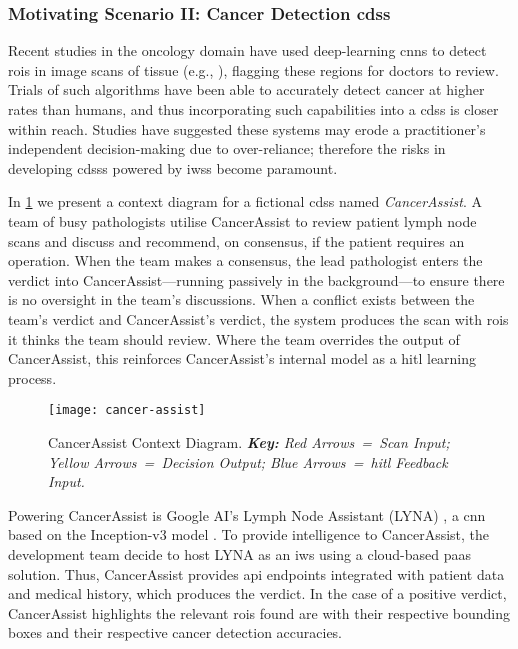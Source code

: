 
\subsubsection{Motivating Scenario II: Cancer Detection \gls{cdss}}
\label{ssec:introduction:motivation:scenario:cancer}

Recent studies in the oncology domain have used deep-learning \glspl{cnn} to detect \glspl{roi} in image scans of tissue (e.g., \citep{Liu:2018fa,Haenssle:2018bz,EhteshamiBejnordi:2017kq}), flagging these regions for doctors to review. Trials of such algorithms have been able to accurately detect cancer at higher rates than humans, and thus incorporating such capabilities into a \gls{cdss} is closer within reach.  Studies have suggested these systems may erode a practitioner's independent decision-making \citep{Jaspers:2011hy,Chambers:1991uh} due to over-reliance; therefore the risks in developing \glspl{cdss} powered by \glspl{iws} become paramount.

In \cref{fig:introduction:motivation:scenario:cancer} we present a context diagram for a fictional \gls{cdss} named \textit{CancerAssist}. A team of busy pathologists utilise CancerAssist to review patient lymph node scans and discuss and recommend, on consensus, if the patient requires an operation. When the team makes a consensus, the lead pathologist enters the verdict into CancerAssist---running passively in the background---to ensure there is no oversight in the team's discussions. When a conflict exists between the team's verdict and CancerAssist's verdict, the system produces the scan with \glspl{roi} it thinks the team should review. Where the team overrides the output of CancerAssist, this reinforces CancerAssist's internal model as a \gls{hitl} learning process.

\begin{figure}[th]
\centering
  \texttt{[image: cancer-assist]}
  \caption[CancerAssist Context Diagram]{CancerAssist Context Diagram. \textit{\textbf{Key:} Red Arrows~=~Scan Input; Yellow Arrows~=~Decision Output; Blue Arrows~=~\gls{hitl} Feedback Input.}}
  \label{fig:introduction:motivation:scenario:cancer}
\end{figure}

Powering CancerAssist is Google AI's Lymph Node Assistant (LYNA) \citep{Liu:2018fa}, a \gls{cnn} based on the Inception-v3 model \citep{Szegedy:2016ws,Krizhevsky:2012wl}. To provide intelligence to CancerAssist, the development team decide to host LYNA as an \gls{iws} using a cloud-based \gls{paas} solution. Thus, CancerAssist provides \gls{api} endpoints integrated with patient data and medical history, which produces the verdict. In the case of a positive verdict, CancerAssist highlights the relevant \glspl{roi} found are with their respective bounding boxes and their respective cancer detection accuracies.

